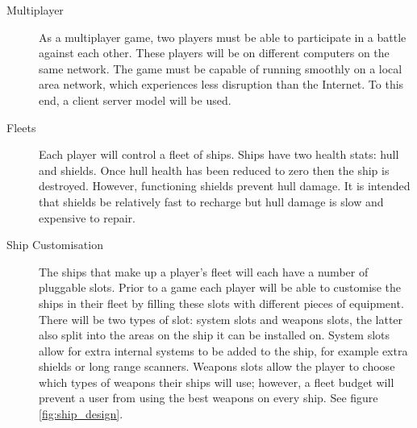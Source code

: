 \begin{description}

	\item[Multiplayer]

	As a multiplayer game, two players must be able to participate in a battle against each other.
	These players will be on different computers on the same network. The game must be capable of running
	smoothly on a local area network, which experiences less disruption than the Internet. To this end, a client server model will be used.

	\item[Fleets]

	Each player will control a fleet of ships. Ships have two health stats: hull and shields. Once hull health has been reduced to zero then the ship is destroyed. However, functioning shields prevent hull damage. It is intended that shields be relatively fast to recharge but hull damage is slow and expensive to repair.

	\item[Ship Customisation]

	The ships that make up a player's fleet will each have a number of pluggable slots. Prior to a game each player will be able to customise the ships in their fleet by filling these slots with different pieces of equipment. There will be two types of slot: system slots and weapons slots, the latter also split into the areas on the ship it can be installed on. System slots allow for extra internal systems to be added to the ship, for example extra shields or long range scanners. Weapons slots allow the player to choose which types of weapons their ships will use; however, a fleet budget will prevent a user from using the best weapons on every ship. See figure \ref{fig:ship_design}.


\end{description}
